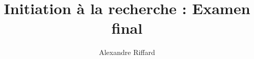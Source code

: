 \documentclass[10pt,twocolumn,letterpaper]{article}
\title{Initiation à la recherche : Examen final}
\author{Alexandre Riffard
}
\begin{document}
\maketitle
\nocite{*}


{\small


}
\end{document}
